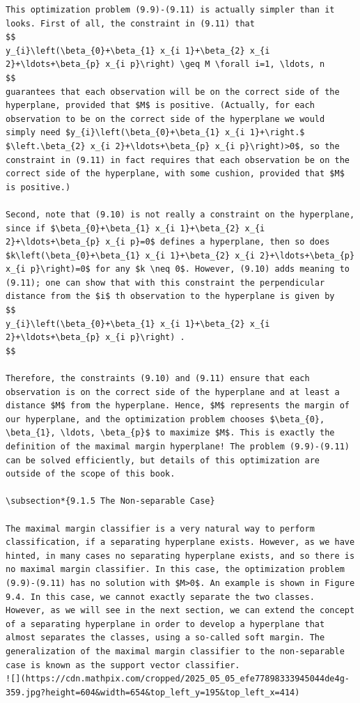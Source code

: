 \documentclass[10pt]{article}
\begin{document}
\begin{verbatim}
This optimization problem (9.9)-(9.11) is actually simpler than it looks. First of all, the constraint in (9.11) that
$$
y_{i}\left(\beta_{0}+\beta_{1} x_{i 1}+\beta_{2} x_{i 2}+\ldots+\beta_{p} x_{i p}\right) \geq M \forall i=1, \ldots, n
$$
guarantees that each observation will be on the correct side of the hyperplane, provided that $M$ is positive. (Actually, for each observation to be on the correct side of the hyperplane we would simply need $y_{i}\left(\beta_{0}+\beta_{1} x_{i 1}+\right.$ $\left.\beta_{2} x_{i 2}+\ldots+\beta_{p} x_{i p}\right)>0$, so the constraint in (9.11) in fact requires that each observation be on the correct side of the hyperplane, with some cushion, provided that $M$ is positive.)

Second, note that (9.10) is not really a constraint on the hyperplane, since if $\beta_{0}+\beta_{1} x_{i 1}+\beta_{2} x_{i 2}+\ldots+\beta_{p} x_{i p}=0$ defines a hyperplane, then so does $k\left(\beta_{0}+\beta_{1} x_{i 1}+\beta_{2} x_{i 2}+\ldots+\beta_{p} x_{i p}\right)=0$ for any $k \neq 0$. However, (9.10) adds meaning to (9.11); one can show that with this constraint the perpendicular distance from the $i$ th observation to the hyperplane is given by
$$
y_{i}\left(\beta_{0}+\beta_{1} x_{i 1}+\beta_{2} x_{i 2}+\ldots+\beta_{p} x_{i p}\right) .
$$

Therefore, the constraints (9.10) and (9.11) ensure that each observation is on the correct side of the hyperplane and at least a distance $M$ from the hyperplane. Hence, $M$ represents the margin of our hyperplane, and the optimization problem chooses $\beta_{0}, \beta_{1}, \ldots, \beta_{p}$ to maximize $M$. This is exactly the definition of the maximal margin hyperplane! The problem (9.9)-(9.11) can be solved efficiently, but details of this optimization are outside of the scope of this book.

\subsection*{9.1.5 The Non-separable Case}

The maximal margin classifier is a very natural way to perform classification, if a separating hyperplane exists. However, as we have hinted, in many cases no separating hyperplane exists, and so there is no maximal margin classifier. In this case, the optimization problem (9.9)-(9.11) has no solution with $M>0$. An example is shown in Figure 9.4. In this case, we cannot exactly separate the two classes. However, as we will see in the next section, we can extend the concept of a separating hyperplane in order to develop a hyperplane that almost separates the classes, using a so-called soft margin. The generalization of the maximal margin classifier to the non-separable case is known as the support vector classifier.
![](https://cdn.mathpix.com/cropped/2025_05_05_efe77898333945044de4g-359.jpg?height=604&width=654&top_left_y=195&top_left_x=414)


\end{verbatim}
\end{document}
